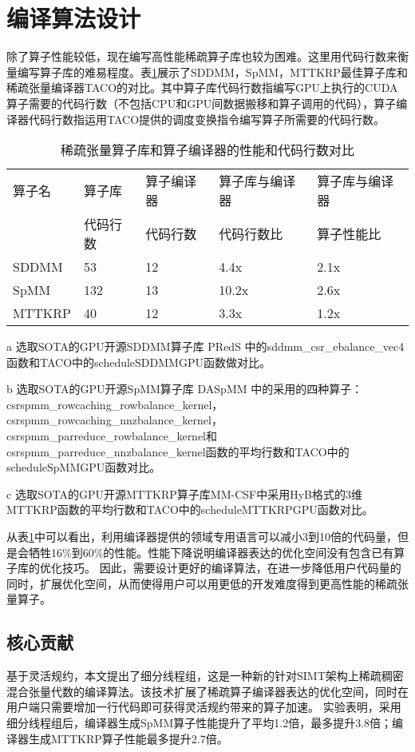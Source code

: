 \section{编译算法设计}
除了算子性能较低，现在编写高性能稀疏算子库也较为困难。这里用代码行数来衡量编写算子库的难易程度。表\ref{tab:motivation-2}展示了SDDMM，SpMM，MTTKRP最佳算子库和稀疏张量编译器TACO的对比。其中算子库代码行数指编写GPU上执行的CUDA算子需要的代码行数（不包括CPU和GPU间数据搬移和算子调用的代码），算子编译器代码行数指运用TACO提供的调度变换指令编写算子所需要的代码行数。
\begin{table}
  \centering
  \begin{threeparttable}[c]
  \caption{稀疏张量算子库和算子编译器的性能和代码行数对比}
  \label{tab:motivation-2}
  \begin{tabular}{lllll}
    \toprule
    算子名  & 算子库 & 算子编译器 & 算子库与编译器 & 算子库与编译器   \\
           & 代码行数 & 代码行数 & 代码行数比    & 算子性能比       \\
    \midrule
    SDDMM\tnote{a}  & 53 & 12 & 4.4x & 2.1x \\
    SpMM\tnote{b}   & 132 & 13 & 10.2x & 2.6x \\
    MTTKRP\tnote{c} & 40 & 12 & 3.3x & 1.2x \\
    \bottomrule
  \end{tabular}
  \begin{tablenotes}
    \item [a] 选取SOTA的GPU开源SDDMM算子库 PRedS \cite{yu2021exploiting}中的sddmm\_csr\_ebalance\_vec4函数和TACO中的scheduleSDDMMGPU函数做对比。
    \item [b] 选取SOTA的GPU开源SpMM算子库 DASpMM \cite{dai2022heuristic}中的采用的四种算子：csrspmm\_rowcaching\_rowbalance\_kernel，
      csrspmm\_rowcaching\_nnzbalance\_kernel，csrspmm\_parreduce\_rowbalance\_kernel和csrspmm\_parreduce\_nnzbalance\_kernel函数的平均行数和TACO中的scheduleSpMMGPU函数对比。
    \item [c] 选取SOTA的GPU开源MTTKRP算子库MM-CSF\cite{nisa2019mttkrp}中采用HyB格式的3维MTTKRP函数的平均行数和TACO中的scheduleMTTKRPGPU函数对比。
  \end{tablenotes}
  \end{threeparttable}
\end{table}
从表\ref{tab:motivation-2}中可以看出，利用编译器提供的领域专用语言可以减小3到10倍的代码量，但是会牺牲16\%到60\%的性能。性能下降说明编译器表达的优化空间没有包含已有算子库的优化技巧。
因此，需要设计更好的编译算法，在进一步降低用户代码量的同时，扩展优化空间，从而使得用户可以用更低的开发难度得到更高性能的稀疏张量算子。
\subsection{核心贡献}
基于灵活规约，本文提出了细分线程组，这是一种新的针对SIMT架构上稀疏稠密混合张量代数的编译算法。该技术扩展了稀疏算子编译器表达的优化空间，同时在用户端只需要增加一行代码即可获得灵活规约带来的算子加速。
实验表明，采用细分线程组后，编译器生成SpMM算子性能提升了平均1.2倍，最多提升3.8倍；编译器生成MTTKRP算子性能最多提升2.7倍。
